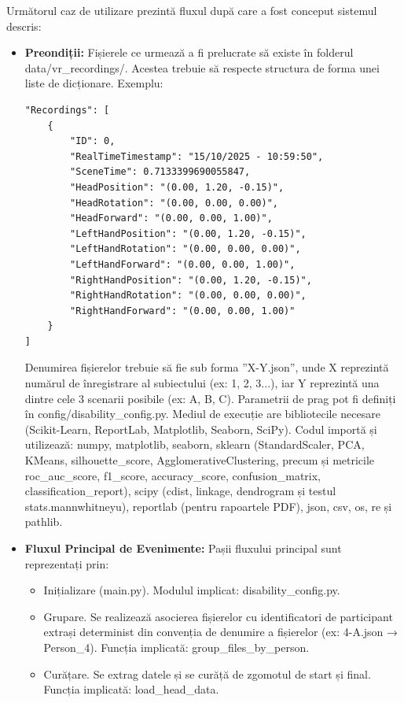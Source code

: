 \documentclass[12pt,a4paper]{report}
\theoremstyle{definition}
\theoremstyle{remark}
\begin{document}
Următorul caz de utilizare prezintă fluxul după care a fost conceput sistemul descris:
\begin{itemize}
    \item \textbf{Preondiții:} Fișierele ce urmează a fi prelucrate să existe în folderul \\ data/vr\_recordings/. Acestea trebuie să respecte structura de forma unei liste de dicționare. Exemplu:  
    \begin{verbatim}
"Recordings": [
    {
        "ID": 0,
        "RealTimeTimestamp": "15/10/2025 - 10:59:50",
        "SceneTime": 0.7133399690055847,
        "HeadPosition": "(0.00, 1.20, -0.15)",
        "HeadRotation": "(0.00, 0.00, 0.00)",
        "HeadForward": "(0.00, 0.00, 1.00)",
        "LeftHandPosition": "(0.00, 1.20, -0.15)",
        "LeftHandRotation": "(0.00, 0.00, 0.00)",
        "LeftHandForward": "(0.00, 0.00, 1.00)",
        "RightHandPosition": "(0.00, 1.20, -0.15)",
        "RightHandRotation": "(0.00, 0.00, 0.00)",
        "RightHandForward": "(0.00, 0.00, 1.00)"
    }
]
\end{verbatim}
    Denumirea fișierelor trebuie să fie sub forma ”X-Y.json”, unde X reprezintă numărul de înregistrare al subiectului (ex: 1, 2, 3...), iar Y reprezintă una dintre cele 3 scenarii posibile (ex: A, B, C).
    Parametrii de prag pot fi definiți în config/disability\_config.py.
    Mediul de execuție are bibliotecile necesare (Scikit-Learn, ReportLab, Matplotlib, Seaborn, SciPy). Codul importă și utilizează: numpy, matplotlib, seaborn, sklearn (StandardScaler, PCA, KMeans, silhouette\_score, AgglomerativeClustering, precum și metricile roc\_auc\_score, f1\_score, accuracy\_score, confusion\_matrix, classification\_report), scipy (cdist, linkage, dendrogram și testul stats.mannwhitneyu), reportlab (pentru rapoartele PDF), json, csv, os, re și pathlib.
    \item \textbf{Fluxul Principal de Evenimente:}
    Pașii fluxului principal sunt reprezentați prin:
    \begin{itemize}
        \item Inițializare (main.py). Modulul implicat: disability\_config.py.
        \item Grupare. Se realizează asocierea fișierelor cu identificatori de participant extrași determinist din convenția de denumire a fișierelor (ex: 4-A.json → Person\_4). Funcția implicată: group\_files\_by\_person.
        \item Curățare. Se extrag datele și se curăță de zgomotul de start și final. Funcția implicată: load\_head\_data.

\end{itemize}
\end{itemize}
\end{document}
